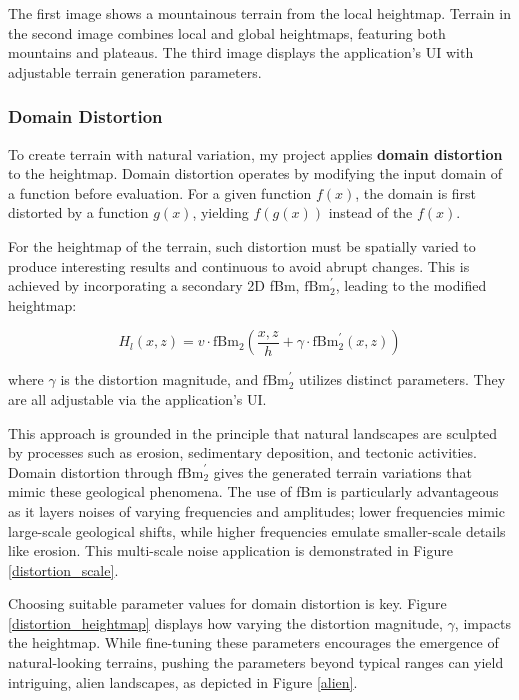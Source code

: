 {The first image shows a mountainous terrain from the local heightmap. Terrain in the second image combines local and global heightmaps, featuring both mountains and plateaus. The third image displays the application's UI with adjustable terrain generation parameters.}


\subsubsection{Domain Distortion}
\label{Domain Distortion}

To create terrain with natural variation, my project applies \textbf{domain distortion} to the heightmap. Domain distortion operates by modifying the input domain of a function before evaluation. For a given function $f(x)$, the domain is first distorted by a function $g(x)$, yielding $f(g(x))$ instead of the $f(x)$.

For the heightmap of the terrain, such distortion must be spatially varied to produce interesting results and continuous to avoid abrupt changes. This is achieved by incorporating a secondary 2D fBm, $\text{fBm}^\prime_2$, leading to the modified heightmap:

\begin{equation}
    H_l(x,z) = v\cdot\text{fBm}_{2}\left(\frac{x,z}{h}+\gamma\cdot\text{fBm}^\prime_2(x,z)\right)
\end{equation}

where $\gamma$ is the distortion magnitude, and $\text{fBm}^\prime_2$ utilizes distinct parameters. They are all adjustable via the application’s UI.

This approach is grounded in the principle that natural landscapes are sculpted by processes such as erosion, sedimentary deposition, and tectonic activities. Domain distortion through $\text{fBm}^\prime_2$ gives the generated terrain variations that mimic these geological phenomena. The use of fBm is particularly advantageous as it layers noises of varying frequencies and amplitudes; lower frequencies mimic large-scale geological shifts, while higher frequencies emulate smaller-scale details like erosion. This multi-scale noise application is demonstrated in Figure \ref{distortion_scale}.

Choosing suitable parameter values for domain distortion is key. Figure \ref{distortion_heightmap} displays how varying the distortion magnitude, $\gamma$, impacts the heightmap. While fine-tuning these parameters encourages the emergence of natural-looking terrains, pushing the parameters beyond typical ranges can yield intriguing, alien landscapes, as depicted in Figure \ref{alien}.

